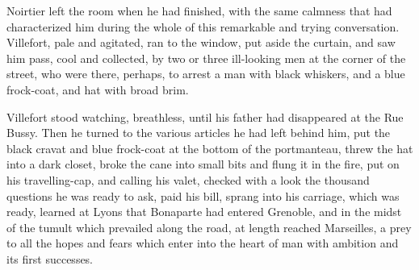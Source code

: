 Noirtier left the room when he had finished, with the same calmness
that had characterized him during the whole of this remarkable and
trying conversation. Villefort, pale and agitated, ran to the window,
put aside the curtain, and saw him pass, cool and collected, by two or
three ill-looking men at the corner of the street, who were there,
perhaps, to arrest a man with black whiskers, and a blue frock-coat,
and hat with broad brim.

Villefort stood watching, breathless, until his father had disappeared
at the Rue Bussy. Then he turned to the various articles he had left
behind him, put the black cravat and blue frock-coat at the bottom of
the portmanteau, threw the hat into a dark closet, broke the cane into
small bits and flung it in the fire, put on his travelling-cap, and
calling his valet, checked with a look the thousand questions he was
ready to ask, paid his bill, sprang into his carriage, which was ready,
learned at Lyons that Bonaparte had entered Grenoble, and in the midst
of the tumult which prevailed along the road, at length reached
Marseilles, a prey to all the hopes and fears which enter into the
heart of man with ambition and its first successes.
